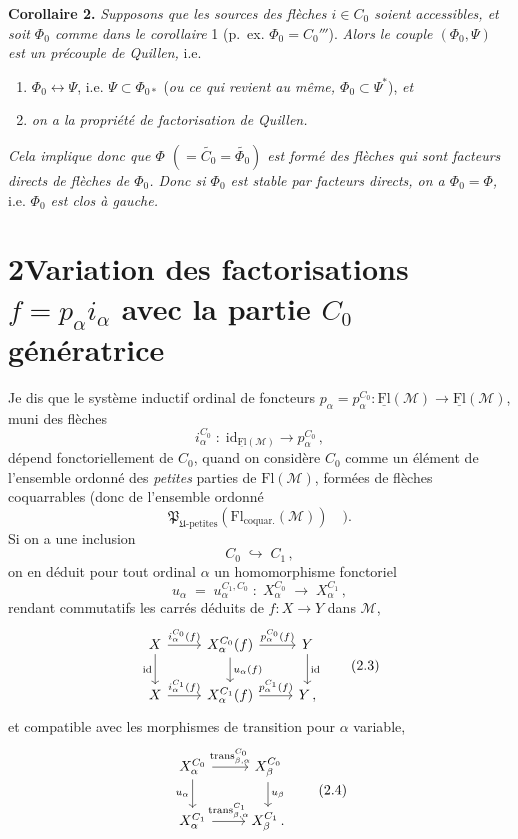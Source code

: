 \documentclass[11pt]{article}
\newcommand{\printedpage}[1]{\marginpar{\footnotesize p.~#1}}
\newcommand{\msp}[1]{\marginpar{\footnotesize [#1]}}
\newcommand{\uFl}{\underline{\mathrm{Fl}}}
\newcommand{\Fl}{\mathrm{Fl}}
\newcommand{\cM}{\mathcal{M}}
\begin{document}
\textbf{Corollaire 2.} \textit{Supposons que les sources des flèches $i\in C_0$ soient accessibles, et soit $\Phi_0$ comme dans le corollaire} 1 (p.~ex. $\Phi_0=C_0'''$). \textit{Alors le couple $(\Phi_0,\Psi)$ est un précouple de Quillen,} i.e.
\begin{enumerate}[label={}, leftmargin=*]
\item[a)] $\Phi_0\longleftrightarrow\Psi$, i.e. $\Psi\subset\Phi_{0*}$ (\textit{ou ce qui revient au même, $\Phi_0\subset\Psi^*$}), \textit{et}
\item[b)] \textit{on a la propriété de factorisation de Quillen.}
\end{enumerate}
\textit{Cela implique donc que $\Phi$ $(=\widetilde{C_0}=\widetilde{\Phi_0})$ est formé des flèches qui sont facteurs directs de flèches de $\Phi_0$. Donc si $\Phi_0$ est stable par facteurs directs, on a $\Phi_0=\Phi$,} i.e. \textit{$\Phi_0$ est clos à gauche.}

\printedpage{10}

\section*{2\quad Variation des factorisations $f=p_\alpha i_\alpha$ avec la partie $C_0$ génératrice}

Je dis que le système inductif ordinal de foncteurs $p_\alpha=p_\alpha^{C_0} : \uFl(\cM)\longrightarrow\uFl(\cM)$,
\msp{page 13}
muni des flèches
\[
i_\alpha^{C_0} \;:\; \mathrm{id}_{\uFl(\cM)} \longrightarrow p_\alpha^{C_0}\,,
\]
dépend fonctoriellement de $C_0$, quand on considère $C_0$ comme un élément de l'ensemble ordonné des \textit{petites} parties de $\Fl(\cM)$, formées de flèches coquarrables (donc de l'ensemble ordonné
\[
\mathfrak{P}_{\mathfrak{U}\text{-petites}}(\Fl_{\text{coquar.}}(\cM)) \quad ).
\]
Si on a une inclusion
\[
C_0 \;\hookrightarrow\; C_1\,,
\tag*{(2.1)}
\]
on en déduit pour tout ordinal $\alpha$ un homomorphisme fonctoriel
\[
u_\alpha \;=\; u_\alpha^{C_1,C_0} \;:\; X_\alpha^{C_0} \;\longrightarrow\; X_\alpha^{C_1}\,,
\tag*{(2.2)}
\]
rendant commutatifs les carrés déduits de $f : X\longrightarrow Y$ dans $\cM$,
\[
\begin{tikzcd}
X \arrow[r, "i_\alpha^{C_0}(f)"] \arrow[d, "\mathrm{id}"'] & X_\alpha^{C_0}(f) \arrow[r, "p_\alpha^{C_0}(f)"] \arrow[d, "u_\alpha(f)"] & Y \arrow[d, "\mathrm{id}"] \\
X \arrow[r, "i_\alpha^{C_1}(f)"] & X_\alpha^{C_1}(f) \arrow[r, "p_\alpha^{C_1}(f)"] & Y\,,
\end{tikzcd}
\tag*{(2.3)}
\]
et compatible avec les morphismes de transition pour $\alpha$ variable,
\[
\begin{tikzcd}
X_\alpha^{C_0} \arrow[r, "{\mathrm{trans}_{\beta,\alpha}^{C_0}}"] \arrow[d, "u_\alpha"'] & X_\beta^{C_0} \arrow[d, "u_\beta"] \\
X_\alpha^{C_1} \arrow[r, "{\mathrm{trans}_{\beta,\alpha}^{C_1}}"] & X_\beta^{C_1}\,.
\end{tikzcd}
\tag*{(2.4)}
\]
\end{document}
